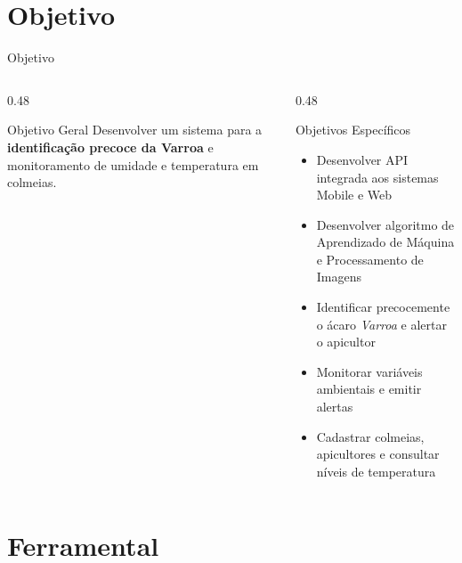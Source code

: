 \documentclass[aspectratio=169]{beamer}
\begin{document}
\section{Objetivo}

\begin{frame}[b]{Objetivo}
  \begin{columns}[T]
    \begin{column}{0.48\textwidth}
      \begin{block}{Objetivo Geral}
        \vspace{0.1em}
        Desenvolver um sistema para a \textbf{identificação precoce da Varroa} e monitoramento de umidade e temperatura em colmeias.
        \vspace{0.1em}
      \end{block}
    \end{column}
    \begin{column}{0.48\textwidth}
      \begin{block}{Objetivos Específicos}
        \begin{itemize}
          \item Desenvolver API integrada aos sistemas Mobile e Web
          \item Desenvolver algoritmo de Aprendizado de Máquina e Processamento de Imagens
          \item Identificar precocemente o ácaro \textit{Varroa} e alertar o apicultor
          \item Monitorar variáveis ambientais e emitir alertas
          \item Cadastrar colmeias, apicultores e consultar níveis de temperatura
        \end{itemize}
        \vspace{0.1em}
      \end{block}
    \end{column}
  \end{columns}
  \vfill
\end{frame}

\section{Ferramental}
\end{document}
